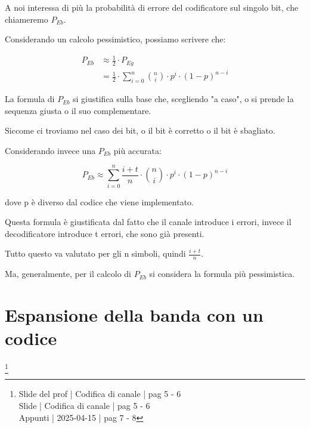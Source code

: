 A noi interessa di più la probabilità di errore del codificatore sul singolo bit, che chiameremo $P_{Eb}$. \newline 

Considerando un calcolo pessimistico, possiamo scrivere che:

{
    \Large 
    \begin{equation}
        \begin{split}
        P_{Eb}
        &\approx 
        \frac{1}{2}
        \cdot 
        P_{Eg}
        \\
        &= 
        \frac{1}{2}
        \cdot
         \sum_{i = 0}^{n} 
        \binom{n}{i} \cdot p^{i} \cdot (1 - p)^{n-i}
        \end{split}
    \end{equation}
}

La formula di $P_{Eb}$ si giustifica sulla base che, scegliendo "a caso", o si prende la sequenza giusta o il suo complementare. \newline 

Siccome ci troviamo nel caso dei bit, o il bit è corretto o il bit è sbagliato. \newline 

Considerando invece una $P_{Eb}$ più accurata: 

{
    \Large 
    \begin{equation}
        P_{Eb}
        \approx
        \sum_{i = 0}^{n} 
        \frac{i + t}{n}
        \cdot
        \binom{n}{i} \cdot p^{i} \cdot (1 - p)^{n-i}
    \end{equation}
}

dove p è diverso dal codice che viene implementato. \newline 

Questa formula è giustificata dal fatto che il canale introduce i errori, 
invece il decodificatore introduce t errori, che sono già presenti. \newline 

Tutto questo va valutato per gli n simboli, quindi $\frac{i + t}{n}$. \newline 

Ma, generalmente, per il calcolo di $P_{Eb}$ si considera la formula più pessimistica. \newline 

\newpage 

\section{Espansione della banda con un codice}
\footnote{Slide del prof | Codifica di canale | pag 5 - 6\\ 
Slide | Codifica di canale | pag  5 - 6\\ 
Appunti | 2025-04-15 | pag 7 - 8
}

